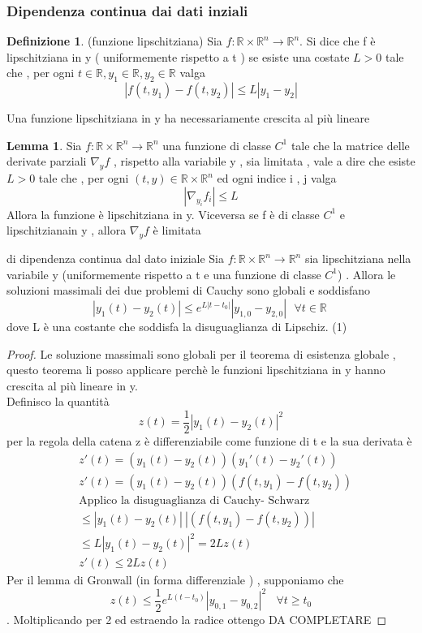 \documentclass{article}
\theoremstyle{definition}
\newtheorem{definizione}{Definizione}[section]
\newtheorem*{lemma}{Lemma}
\newcommand{\R}{\mathbb{R}}
\newcommand{\Rn}{\R^n}
\newcommand{\norm}[1]{|#1|}
\begin{document}
 \subsubsection{Dipendenza continua dai dati inziali}
 \begin{definizione}(funzione lipschitziana) \newline 
 	 	 Sia $f:\R \times \Rn \rightarrow \Rn$. Si dice che f è lipschitziana in y ( uniformemente rispetto a t ) se esiste una costate $L > 0$ tale che , per ogni $t \in \R , y_1 \in \R , y_2 \in \R $ valga 
 	 	 \begin{equation}
 	 	 \norm{f(t,y_1)-f(t,y_2)} \leq L \norm{y_1 - y_2}
 	 	  	 	 \end{equation}
 	 	 \end{definizione}
 	 	 Una funzione lipschitziana in y ha necessariamente crescita al più lineare 
 	 	 \begin{lemma}
 	 	 	Sia $f:\R \times \Rn \rightarrow \Rn$ una funzione di classe $C^1$ tale che la matrice delle derivate parziali $\nabla_y f$ , rispetto alla variabile y , sia limitata , vale a dire che esiste $L > 0 $ tale che , per ogni $(t,y) \in \R \times \Rn$ ed ogni indice i , j valga $$\norm{\nabla_{y_i}f_i } \leq L $$
 	 	 	Allora la funzione è lipschitziana in y. Viceversa se f è di classe $C^1$ e lipschitzianain y , allora $\nabla_y f$  è limitata 
 	 	 \end{lemma}
 	 	 \begin{teo}{di dipendenza continua dal dato iniziale }{}
 	 	 	Sia $f:\R \times \Rn \rightarrow \Rn$ sia lipschitziana nella variabile y (uniformemente rispetto a t e una funzione di classe $C^1$) . Allora le soluzioni massimali  dei due problemi di Cauchy sono globali e soddisfano 
 	 	 	$$\norm{y_1(t)-y_2(t)}\leq e^{L\norm{t-t_0}}\norm{y_{1,0}-y_{2,0}}  \ \ \ \forall t \in \R \ $$
 	 	 	dove L è una costante che soddisfa la disuguaglianza di Lipschiz. (1)
 	 	 \end{teo}
 	 	 \begin{proof}
 	 	 	Le soluzione massimali sono globali per il teorema di esistenza globale , questo teorema li posso applicare perchè le funzioni lipschitziana in y hanno crescita al più lineare in y. \\
 	 	 	Definisco la quantità $$z(t)=\frac{1}{2}\norm{y_1(t)-y_2(t)}^2$$  per la regola della catena z è differenziabile come funzione di t e la sua derivata è  
 	 	 	\begin{align*}
 	 	 	&z'(t)=(y_1(t)-y_2(t))(y_1'(t)-y_2'(t))\\
 	 	 	&z'(t)=(y_1(t)-y_2(t))(f(t,y_1)-f(t,y_2)) \\
 	 	 	&\text{Applico la disuguaglianza di Cauchy- Schwarz}\\
 	 	 	&\leq \norm{ y_1(t)-y_2(t)}\ \norm{(f(t,y_1)-f(t,y_2))} \\
 	 	 	&\leq L\norm{y_1(t)-y_2(t)}^2=2Lz(t)\\
 	 	 	&z'(t)\leq 2Lz(t)
 	 	 		\end{align*}
 	 	 	Per il lemma di Gronwall (in forma differenziale ) , supponiamo che $$z(t) \leq \frac{1}{2}e^{L(t-t_0)} \norm{y_{0,1}-y_{0,2}}^2  \ \ \ \ \forall t \geq t_0$$. Moltiplicando per 2 ed estraendo la radice ottengo  DA COMPLETARE 	 	 	\end{proof}
 	 	 	\newpage
\end{document}
